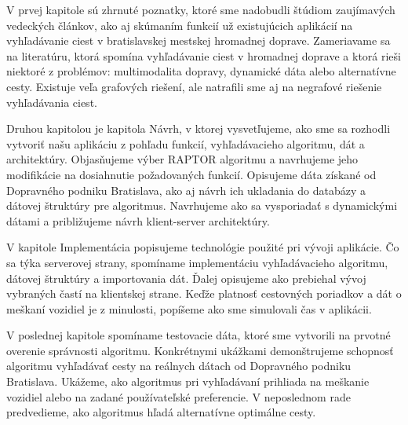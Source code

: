 V prvej kapitole sú zhrnuté poznatky, ktoré sme nadobudli štúdiom zaujímavých vedeckých článkov, ako aj skúmaním funkcií už existujúcich aplikácií na vyhľadávanie ciest v bratislavskej mestskej hromadnej doprave. Zameriavame sa na literatúru, ktorá spomína vyhľadávanie ciest v hromadnej doprave a ktorá rieši niektoré z problémov: multimodalita dopravy, dynamické dáta alebo alternatívne cesty. Existuje veľa grafových riešení, ale natrafili sme aj na negrafové riešenie vyhľadávania ciest. 

Druhou kapitolou je kapitola Návrh, v ktorej vysvetľujeme, ako sme sa rozhodli vytvoriť našu aplikáciu z pohľadu funkcií, vyhľadávacieho algoritmu, dát a architektúry. Objasňujeme výber RAPTOR algoritmu a navrhujeme jeho modifikácie na dosiahnutie požadovaných funkcií. Opisujeme dáta získané od Dopravného podniku Bratislava, ako aj návrh ich ukladania do databázy a dátovej štruktúry pre algoritmus. Navrhujeme ako sa vysporiadať s dynamickými dátami a približujeme návrh klient-server architektúry.

V kapitole Implementácia popisujeme technológie použité pri vývoji aplikácie. Čo sa týka serverovej strany, spomíname implementáciu vyhľadávacieho algoritmu, dátovej štruktúry a importovania dát. Ďalej opisujeme ako prebiehal vývoj vybraných častí na klientskej strane. Keďže platnosť cestovných poriadkov a dát o meškaní vozidiel je z minulosti, popíšeme ako sme simulovali čas v aplikácii. 

V poslednej kapitole spomíname testovacie dáta, ktoré sme vytvorili na prvotné overenie správnosti algoritmu. Konkrétnymi ukážkami demonštrujeme schopnosť algoritmu vyhľadávať cesty na reálnych dátach od Dopravného podniku Bratislava. Ukážeme, ako algoritmus pri vyhľadávaní prihliada na meškanie vozidiel alebo na zadané používateľské preferencie. V neposlednom rade predvedieme, ako algoritmus hľadá alternatívne optimálne cesty. 


